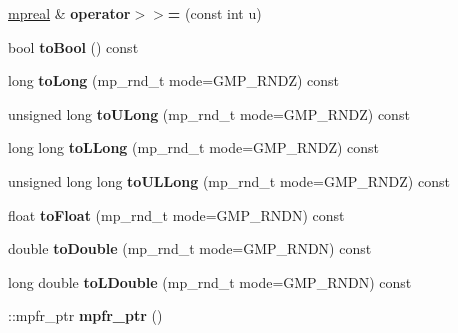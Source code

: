 \begin{DoxyCompactItemize}
\mbox{\label{classmpfr_1_1mpreal_a600f02b2b006a0bc2a3145f311e49d38}} 
\hyperlink{classmpfr_1_1mpreal}{mpreal} \& {\bfseries operator$>$$>$=} (const int u)
\item 
\mbox{\label{classmpfr_1_1mpreal_a8668c7c60f1060a9c35cebc1f818e516}} 
bool {\bfseries to\+Bool} () const
\item 
\mbox{\label{classmpfr_1_1mpreal_a4f3de2ed6629255ee7fb5e3ed9ad50e2}} 
long {\bfseries to\+Long} (mp\+\_\+rnd\+\_\+t mode=G\+M\+P\+\_\+\+R\+N\+DZ) const
\item 
\mbox{\label{classmpfr_1_1mpreal_a283bb8637d725d59ea1b3e2c7159ef8b}} 
unsigned long {\bfseries to\+U\+Long} (mp\+\_\+rnd\+\_\+t mode=G\+M\+P\+\_\+\+R\+N\+DZ) const
\item 
\mbox{\label{classmpfr_1_1mpreal_aa59c1e2a2ae1ebffc2bf21a13bd55638}} 
long long {\bfseries to\+L\+Long} (mp\+\_\+rnd\+\_\+t mode=G\+M\+P\+\_\+\+R\+N\+DZ) const
\item 
\mbox{\label{classmpfr_1_1mpreal_acbda71ccfc35989a61ef7811262430d0}} 
unsigned long long {\bfseries to\+U\+L\+Long} (mp\+\_\+rnd\+\_\+t mode=G\+M\+P\+\_\+\+R\+N\+DZ) const
\item 
\mbox{\label{classmpfr_1_1mpreal_a65701dfcda1e63a744cca47fa979ed29}} 
float {\bfseries to\+Float} (mp\+\_\+rnd\+\_\+t mode=G\+M\+P\+\_\+\+R\+N\+DN) const
\item 
\mbox{\label{classmpfr_1_1mpreal_a392fec4ce0f7ee156acf9a344b81c68f}} 
double {\bfseries to\+Double} (mp\+\_\+rnd\+\_\+t mode=G\+M\+P\+\_\+\+R\+N\+DN) const
\item 
\mbox{\label{classmpfr_1_1mpreal_a4dea97c2ce362d9f4cbe49cbce792ca7}} 
long double {\bfseries to\+L\+Double} (mp\+\_\+rnd\+\_\+t mode=G\+M\+P\+\_\+\+R\+N\+DN) const
\item 
\mbox{\label{classmpfr_1_1mpreal_a7123caf7a4f66257fc48246ff31f76e9}} 
\+::mpfr\+\_\+ptr {\bfseries mpfr\+\_\+ptr} ()
\item 

\end{DoxyCompactItemize}

